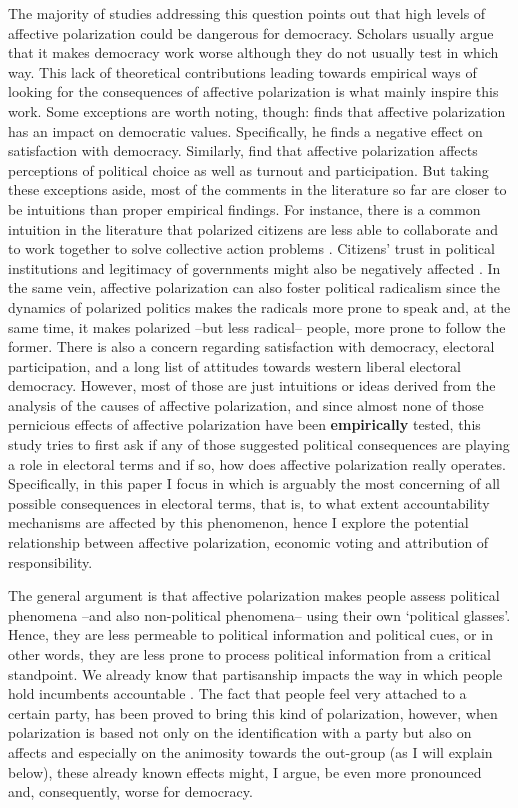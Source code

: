 \documentclass[a4paper, svgnames]{article}
\begin{document}
The majority of studies addressing this question points out that high levels of affective polarization could be dangerous for democracy. Scholars usually argue that it makes democracy work worse although they do not usually test in which way. This lack of theoretical contributions leading towards empirical ways of looking for the consequences of affective polarization is what mainly inspire this work. Some exceptions are worth noting, though: \cite{Wagner2021} finds that affective polarization has an impact on democratic values. Specifically, he finds a negative effect on satisfaction with democracy. Similarly, \cite{Ward2019} find that affective polarization affects perceptions of political choice as well as turnout and participation. But taking these exceptions aside, most of the comments in the literature so far are closer to be intuitions than proper empirical findings. For instance, there is a common intuition in the literature that polarized citizens are less able to collaborate and to work together to solve collective action problems \citep{Garrett2014}. Citizens' trust in political institutions and legitimacy of governments might also be negatively affected \citep{Orriols2021}. In the same vein, affective polarization can also foster political radicalism \citep{Levendusky2013, Rogowski2016a, Webster2017} since the dynamics of polarized politics makes the radicals more prone to speak and, at the same time, it makes polarized --but less radical-- people, more prone to follow the former. There is also a concern regarding satisfaction with democracy, electoral participation, and a long list of attitudes towards western liberal electoral democracy. However, most of those are just intuitions or ideas derived from the analysis of the causes of affective polarization, and since almost none of those pernicious effects of affective polarization have been \textbf{empirically} tested, this study tries to first ask if any of those suggested political consequences are playing a role in electoral terms and if so, how does affective polarization really operates. Specifically, in this paper I focus in which is arguably the most concerning of all possible consequences in electoral terms, that is, to what extent accountability mechanisms are affected by this phenomenon, hence I explore the potential relationship between affective polarization, economic voting and attribution of responsibility.

The general argument is that affective polarization makes people assess political phenomena --and also non-political phenomena-- using their own `political glasses'. Hence, they are less permeable to political information and political cues, or in other words, they are less prone to process political information from a critical standpoint. We already know that partisanship impacts the way in which people hold incumbents accountable \citet*{tilleyGovernmentBlameExperimental2011a}. The fact that people feel very attached to a certain party, has been proved to bring this kind of polarization, however, when polarization is based not only on the identification with a party but also on affects and especially on the animosity towards the out-group (as I will explain below), these already known effects might, I argue, be even more pronounced and, consequently, worse for democracy.
\end{document}
